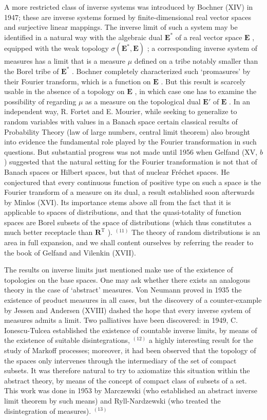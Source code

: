A more restricted class of inverse systems was introduced by Bochner (XIV) in 1947; these are inverse systems formed by finite-dimensional real vector spaces and surjective linear mappings. The inverse limit of such a system may be identified in a natural way with the algebraic dual \(\mathbf{E}^*\) of a real vector space \(\mathbf{E}\) , equipped with the weak topology \(\sigma (\mathbf{E}^{*},\mathbf{E})\) ; a corresponding inverse system of measures has a limit that is a measure \(\mu\) defined on a tribe notably smaller than the Borel tribe of \(\mathbf{E}^*\) . Bochner completely characterized such `promasures' by their Fourier transform, which is a function on \(\mathbf{E}\) . But this result is scarcely usable in the absence of a topology on \(\mathbf{E}\) , in which case one has to examine the possibility of regarding \(\mu\) as a measure on the topological dual \(\mathbf{E}'\) of \(\mathbf{E}\) . In an independent way, R. Fortet and E. Mourier, while seeking to generalize to random variables with values in a Banach space certain classical results of Probability Theory (law of large numbers, central limit theorem) also brought into evidence the fundamental role played by the Fourier transformation in such questions. But substantial progress was not made until 1956 when Gelfand (XV, \(b\) ) suggested that the natural setting for the Fourier transformation is not that of Banach spaces or Hilbert spaces, but that of nuclear Fréchet spaces. He conjectured that every continuous function of positive type on such a space is the Fourier transform of a measure on its dual, a result established soon afterwards by Minlos (XVI). Its importance stems above all from the fact that it is applicable to spaces of distributions, and that the quasi-totality of function spaces are Borel subsets of the space of distributions (which thus constitutes a much better receptacle than \(\mathbf{R}^{\mathrm{T}}\) ). \(^{(11)}\) The theory of random distributions is an area in full expansion, and we shall content ourselves by referring the reader to the book of Gelfand and Vilenkin (XVII).

The results on inverse limits just mentioned make use of the existence of topologies on the base spaces. One may ask whether there exists an analogous theory in the case of `abstract' measures. Von Neumann proved in 1935 the existence of product measures in all cases, but the discovery of a counter-example by Jessen and Andersen (XVIII) dashed the hope that every inverse system of measures admits a limit. Two palliatives have been discovered: in 1949, C. Ionescu-Tulcea established the existence of countable inverse limits, by means of the existence of suitable disintegrations, \(^{(12)}\) a highly interesting result for the study of Markoff processes; moreover, it had been observed that the topology of the spaces only intervenes through the intermediary of the set of compact subsets. It was therefore natural to try to axiomatize this situation within the abstract theory, by means of the concept of compact class of subsets of a set. This work was done in 1953 by Marczewski (who established an abstract inverse limit theorem by such means) and Ryll-Nardzewski (who treated the disintegration of measures). \(^{(13)}\)

